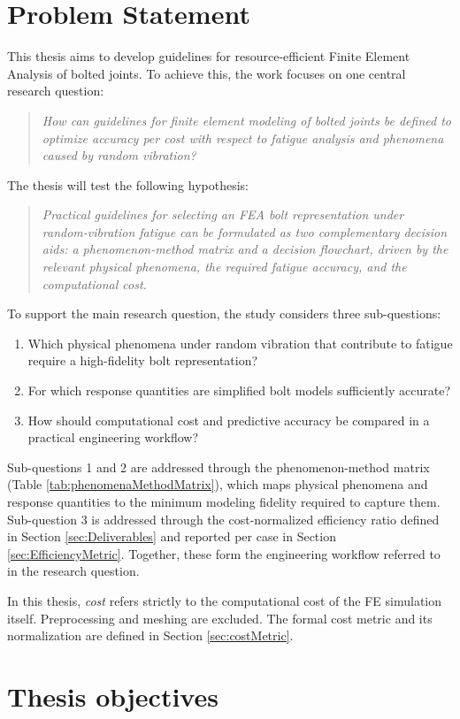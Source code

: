 \documentclass[a4paper,twoside]{bth}
\newcommand{\RQ}{How can guidelines for finite element modeling of bolted joints be defined to optimize accuracy per cost with respect to fatigue analysis and phenomena caused by random vibration?}
\newcommand{\HYP}{Practical guidelines for selecting an \ac{FEA} bolt representation under random-vibration fatigue can be formulated as two complementary decision aids: a phenomenon-method matrix and a decision flowchart, driven by the relevant physical phenomena, the required fatigue accuracy, and the computational cost.}
\begin{document}
\section{Problem Statement} \label{sec:problemStatement}
This thesis aims to develop guidelines for resource-efficient Finite Element Analysis of bolted joints. To achieve this, the work focuses on one central research question:
\begin{quote}
    \textit{\RQ}    
\end{quote}

The thesis will test the following hypothesis:

\begin{quote}
    \textit{\HYP}    
\end{quote}

To support the main research question, the study considers three sub-questions:
\begin{enumerate}
    \item Which physical phenomena under random vibration that contribute to fatigue require a high-fidelity bolt representation?
    \item For which response quantities are simplified bolt models sufficiently accurate?
    \item How should computational cost and predictive accuracy be compared in a practical engineering workflow?
\end{enumerate}

Sub-questions 1 and 2 are addressed through the phenomenon-method matrix (Table \ref{tab:phenomenaMethodMatrix}), which maps physical phenomena and response quantities to the minimum modeling fidelity required to capture them. Sub-question 3 is addressed through the cost-normalized efficiency ratio defined in Section \ref{sec:Deliverables} and reported per case in Section \ref{sec:EfficiencyMetric}. Together, these form the engineering workflow referred to in the research question.

In this thesis, \textit{cost} refers strictly to the computational cost of the \ac{FE} simulation itself. Preprocessing and meshing are excluded. The formal cost metric and its normalization are defined in Section \ref{sec:costMetric}.
\newpage
\section{Thesis objectives}

\end{document}
